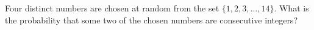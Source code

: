 Four distinct numbers are chosen at random from the set $\{1,2,3,\ldots,14\}$. What is the probability that some two of the chosen numbers are consecutive integers?
